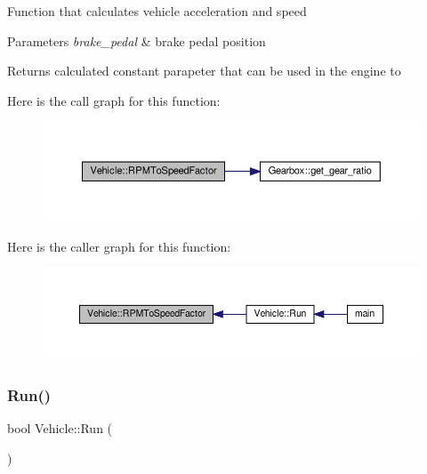 Function that calculates vehicle acceleration and speed 
\begin{DoxyParams}{Parameters}
{\em brake\+\_\+pedal} & brake pedal position \\
\hline
\end{DoxyParams}
\begin{DoxyReturn}{Returns}
calculated constant parapeter that can be used in the engine to 
\end{DoxyReturn}
Here is the call graph for this function\+:
\nopagebreak
\begin{figure}[H]
\begin{center}
\leavevmode
\includegraphics[width=350pt]{classVehicle_a52a12c60b5a8885dc9f95643c84958a8_cgraph}
\end{center}
\end{figure}
Here is the caller graph for this function\+:
\nopagebreak
\begin{figure}[H]
\begin{center}
\leavevmode
\includegraphics[width=350pt]{classVehicle_a52a12c60b5a8885dc9f95643c84958a8_icgraph}
\end{center}
\end{figure}
\mbox{\label{classVehicle_a407e09d1ff69f43d3c4aa77f4f32a51c}} 
\subsubsection{\texorpdfstring{Run()}{Run()}}
{\footnotesize\ttfamily bool Vehicle\+::\+Run (\begin{DoxyParamCaption}{ }\end{DoxyParamCaption})}

